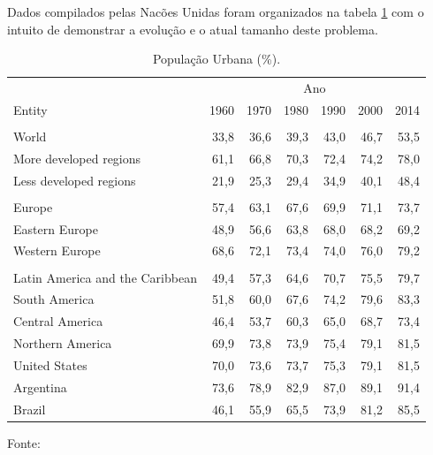 \documentclass[
	12pt,				%
	oneside,			%
	a4paper,			%
	chapter=TITLE,		%
	section=TITLE,		%
	english,			%
	brazil				%
	]{abntex2}
\newcommand{\bcenter}{\begin{center}}
\newcommand{\ecenter}{\end{center}}
\begin{document}
Dados compilados pelas Nacões Unidas foram organizados na tabela
\ref{tab:pop-table} com o intuito de demonstrar a evolução e o atual
tamanho deste problema.
\begin{table}[H]

\caption{\label{tab:pop-table}População Urbana (\%).}
\centering
\begin{tabular}[t]{lrrrrrr}
\toprule
\multicolumn{1}{c}{} & \multicolumn{6}{c}{Ano} \\
\cmidrule(l{3pt}r{3pt}){2-7}
Entity & 1960 & 1970 & 1980 & 1990 & 2000 & 2014\\
\midrule
\rowcolor{gray!6}  \addlinespace[0.3em]
\multicolumn{7}{l}{\textbf{Mundo}}\\
\hspace{1em}World & 33,8 & 36,6 & 39,3 & 43,0 & 46,7 & 53,5\\
\hspace{1em}More developed regions & 61,1 & 66,8 & 70,3 & 72,4 & 74,2 & 78,0\\
\hspace{1em}Less developed regions & 21,9 & 25,3 & 29,4 & 34,9 & 40,1 & 48,4\\
\rowcolor{gray!6}  \addlinespace[0.3em]
\multicolumn{7}{l}{\textbf{Europa}}\\
\hspace{1em}Europe & 57,4 & 63,1 & 67,6 & 69,9 & 71,1 & 73,7\\
\hspace{1em}Eastern Europe & 48,9 & 56,6 & 63,8 & 68,0 & 68,2 & 69,2\\
\hspace{1em}Western Europe & 68,6 & 72,1 & 73,4 & 74,0 & 76,0 & 79,2\\
\rowcolor{gray!6}  \addlinespace[0.3em]
\multicolumn{7}{l}{\textbf{América}}\\
\hspace{1em}Latin America and the Caribbean & 49,4 & 57,3 & 64,6 & 70,7 & 75,5 & 79,7\\
\hspace{1em}South America & 51,8 & 60,0 & 67,6 & 74,2 & 79,6 & 83,3\\
\hspace{1em}Central America & 46,4 & 53,7 & 60,3 & 65,0 & 68,7 & 73,4\\
\hspace{1em}Northern America & 69,9 & 73,8 & 73,9 & 75,4 & 79,1 & 81,5\\
\hspace{1em}United States & 70,0 & 73,6 & 73,7 & 75,3 & 79,1 & 81,5\\
\hspace{1em}Argentina & 73,6 & 78,9 & 82,9 & 87,0 & 89,1 & 91,4\\
\hspace{1em}Brazil & 46,1 & 55,9 & 65,5 & 73,9 & 81,2 & 85,5\\
\bottomrule
\end{tabular}
\end{table}
\bcenter
Fonte: \textcite{doi:10.1177/0959683609356587} \ecenter
\end{document}
